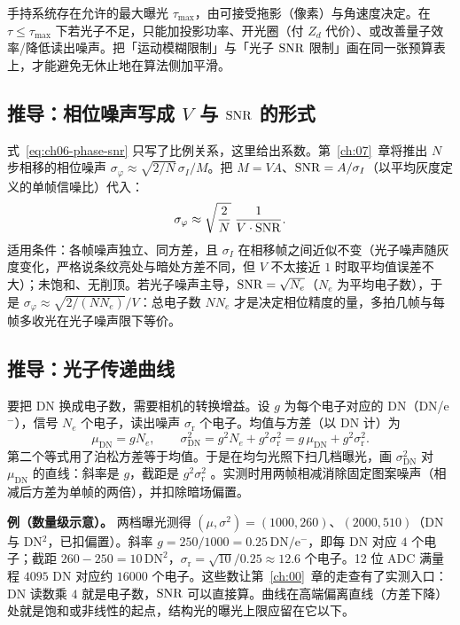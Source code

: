 手持系统存在允许的最大曝光 $\tau_{\max}$，由可接受拖影（像素）与角速度决定。在 $\tau\le\tau_{\max}$ 下若光子不足，只能加投影功率、开光圈（付 $Z_d$ 代价）、或改善量子效率/降低读出噪声。把「运动模糊限制」与「光子 $\mathrm{SNR}$ 限制」画在同一张预算表上，才能避免无休止地在算法侧加平滑。

\subsection{推导：相位噪声写成 $V$ 与 $\mathrm{SNR}$ 的形式}

式~\eqref{eq:ch06-phase-snr} 只写了比例关系，这里给出系数。第~\ref{ch:07}~章将推出 $N$ 步相移的相位噪声 $\sigma_\varphi\approx\sqrt{2/N}\,\sigma_I/M$。把 $M=VA$、$\mathrm{SNR}=A/\sigma_I$（以平均灰度定义的单帧信噪比）代入：
\begin{equation}
  \sigma_\varphi\approx\sqrt{\frac{2}{N}}\;\frac{1}{V\cdot\mathrm{SNR}}.
  \label{eq:ch06-phase-snr-N}
\end{equation}
适用条件：各帧噪声独立、同方差，且 $\sigma_I$ 在相移帧之间近似不变（光子噪声随灰度变化，严格说条纹亮处与暗处方差不同，但 $V$ 不太接近 $1$ 时取平均值误差不大）；未饱和、无削顶。若光子噪声主导，$\mathrm{SNR}=\sqrt{N_e}$（$N_e$ 为平均电子数），于是 $\sigma_\varphi\approx\sqrt{2/(N N_e)}/V$：总电子数 $NN_e$ 才是决定相位精度的量，多拍几帧与每帧多收光在光子噪声限下等价。

\subsection{推导：光子传递曲线}

要把 DN 换成电子数，需要相机的转换增益。设 $g$ 为每个电子对应的 DN（DN/e$^-$），信号 $N_e$ 个电子，读出噪声 $\sigma_{\mathrm r}$ 个电子。均值与方差（以 DN 计）为
\[
  \mu_{\mathrm{DN}}=gN_e,\qquad
  \sigma_{\mathrm{DN}}^2=g^2N_e+g^2\sigma_{\mathrm r}^2=g\,\mu_{\mathrm{DN}}+g^2\sigma_{\mathrm r}^2 .
\]
第二个等式用了泊松方差等于均值。于是在均匀光照下扫几档曝光，画 $\sigma_{\mathrm{DN}}^2$ 对 $\mu_{\mathrm{DN}}$ 的直线：斜率是 $g$，截距是 $g^2\sigma_{\mathrm r}^2$ \citep{Janesick2001PhotonTransfer}。实测时用两帧相减消除固定图案噪声（相减后方差为单帧的两倍），并扣除暗场偏置。

\textbf{例（数量级示意）。} 两档曝光测得 $(\mu,\sigma^2)=(1000,260)$、$(2000,510)$（DN 与 DN$^2$，已扣偏置）。斜率 $g=250/1000=0.25\,\mathrm{DN/e^-}$，即每 DN 对应 $4$ 个电子；截距 $260-250=10\,\mathrm{DN^2}$，$\sigma_{\mathrm r}=\sqrt{10}/0.25\approx12.6$ 个电子。12 位 ADC 满量程 $4095$ DN 对应约 $16000$ 个电子。这些数让第~\ref{ch:00}~章的走查有了实测入口：DN 读数乘 $4$ 就是电子数，$\mathrm{SNR}$ 可以直接算。曲线在高端偏离直线（方差下降）处就是饱和或非线性的起点，结构光的曝光上限应留在它以下。

